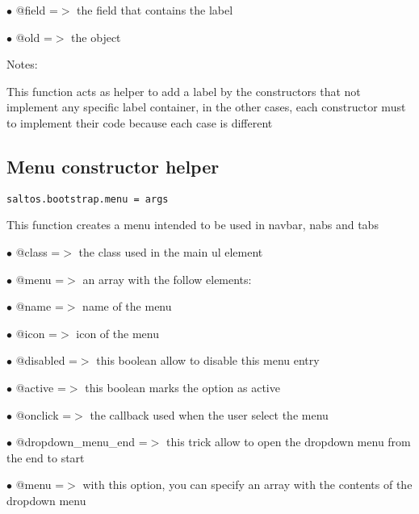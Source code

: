 \documentclass[a4paper]{book}
\begin{document}
\begin{compactitem}
\item[\color{myblue}$\bullet$] @field =$>$ the field that contains the label
\item[\color{myblue}$\bullet$] @old   =$>$ the object
\end{compactitem}

Notes:

This function acts as helper to add a label by the constructors that not implement
any specific label container, in the other cases, each constructor must to implement
their code because each case is different

\hypertarget{toc471}{}
\subsection{Menu constructor helper}

\begin{lstlisting}
saltos.bootstrap.menu = args
\end{lstlisting}

This function creates a menu intended to be used in navbar, nabs and tabs

\begin{compactitem}
\item[\color{myblue}$\bullet$] @class =$>$ the class used in the main ul element
\item[\color{myblue}$\bullet$] @menu  =$>$ an array with the follow elements:
\end{compactitem}

\begin{compactitem}
\item[\color{myblue}$\bullet$] @name              =$>$ name of the menu
\item[\color{myblue}$\bullet$] @icon              =$>$ icon of the menu
\item[\color{myblue}$\bullet$] @disabled          =$>$ this boolean allow to disable this menu entry
\item[\color{myblue}$\bullet$] @active            =$>$ this boolean marks the option as active
\item[\color{myblue}$\bullet$] @onclick           =$>$ the callback used when the user select the menu
\item[\color{myblue}$\bullet$] @dropdown\_menu\_end =$>$ this trick allow to open the dropdown menu from the end to start
\item[\color{myblue}$\bullet$] @menu              =$>$ with this option, you can specify an array with the contents of the dropdown menu
\end{compactitem}
\end{document}
